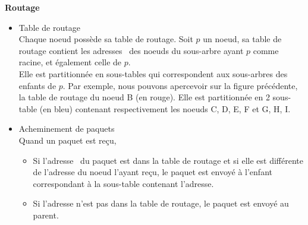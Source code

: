         \textbf{Routage}\newline
        \begin{itemize}
            \item Table de routage\\
                Chaque noeud possède sa table de routage. Soit $p$ un noeud, sa table de routage contient les adresses \mac\ 
                des noeuds du sous-arbre ayant $p$ comme racine, et également celle de $p$.\\
                Elle est partitionnée en sous-tables qui correspondent aux sous-arbres des enfants de $p$.
                Par exemple, nous pouvons apercevoir sur la figure précédente, la table de routage du noeud B (en rouge).
                Elle est partitionnée en 2 sous-table (en bleu) contenant respectivement les noeuds C, D, E, F et G, H, I.
            \item Acheminement de paquets\\
                Quand un paquet est reçu,
                \begin{itemize}
                    \item Si l'adresse \mac\ du paquet est dans la table de routage et si elle est différente de l'adresse du noeud l'ayant reçu, le paquet est envoyé
                    à l'enfant correspondant à la sous-table contenant l'adresse.
                    \item Si l'adresse n'est pas dans la table de routage, le paquet est envoyé au parent.
                \end{itemize}

        \end{itemize}
        \vspace{0.5cm}

